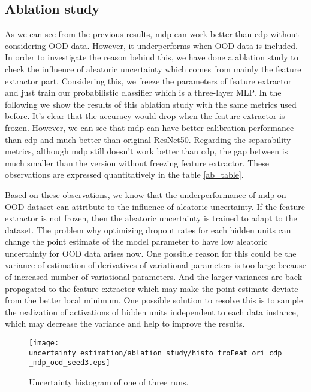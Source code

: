 \subsection{Ablation study}
As we can see from the previous results, mdp can work better than cdp without considering OOD data. However, it underperforms when OOD data is included. In order to investigate the reason behind this, we have done a ablation study to check the influence of aleatoric uncertainty which comes from mainly the feature extractor part. Considering this, we freeze the parameters of feature extractor and just train our probabilistic classifier which is a three-layer MLP. In the following we show the results of this ablation study with the same metrics used before. It's clear that the accuracy would drop when the feature extractor is frozen. However, we can see that mdp can have better  calibration performance than cdp and much better than original ResNet50. Regarding the separability metrics, although mdp still doesn't work better than cdp, the gap between is much smaller than the version without freezing feature extractor. These observations are expressed quantitatively in the table \ref{ab_table}. 

Based on these observations, we know that the underperformance of mdp on OOD dataset can attribute to the influence of aleatoric uncertainty. If the feature extractor is not frozen, then the aleatoric uncertainty is trained to adapt to the dataset. The problem why optimizing dropout rates for each hidden units can change the point estimate of the model parameter to have low aleatoric uncertainty for OOD data arises now. One possible reason for this could be the variance of estimation of derivatives of variational parameters is too large because of increased number of variational parameters\cite{kingma2015variational}. And the larger variances are back propagated to the feature extractor which may make the point estimate deviate from the better local minimum. One possible solution to resolve this is to sample the realization of activations of hidden units independent to each data instance, which may decrease the variance and help to improve the results. 

\begin{figure}[H]
	\begin{center}
		\texttt{[image: uncertainty\_estimation/ablation\_study/histo\_froFeat\_ori\_cdp\_mdp\_ood\_seed3.eps]}
		\caption{Uncertainty histogram of one of three runs.}		
		\label{ab_reliability}
	\end{center}
\end{figure}

